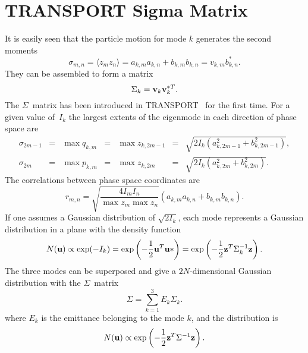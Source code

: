  
\section{TRANSPORT Sigma Matrix}
It is easily seen that the particle motion for mode $k$ generates
the second moments
\begin{equation}
\sigma_{m,n} = \langle z_m z_n\rangle =
a_{k,m} a_{k,n} + b_{k,m} b_{k,n} = v_{k,m} b^*_{k,n}.
\end{equation}
They can be assembled to form a matrix
\begin{equation}
\Sigma_k = \bold{v}_k \bold{v}_k^{*T}.
\end{equation}
The $\Sigma$~matrix has been introduced in TRANSPORT~\cite{SLAC75}
for the first time.
For a given value of~$I_k$ the largest extents
of the eigenmode in each direction of phase space are
\begin{equation}\begin{array}{lllllll}
\sigma_{2m-1} &=& \max q_{k,m} &=& \max z_{k,2m-1} &=&
\sqrt{2 I_k (a_{k,2m-1}^2 + b_{k,2m-1}^2)}, \\
\sigma_{2m} &=& \max p_{k,m} &=& \max z_{k,2m} &=&
\sqrt{2 I_k (a_{k,2m}^2 + b_{k,2m}^2)}.
\end{array}\end{equation}
The correlations between phase space coordinates are
\begin{equation}
r_{m,n} = \sqrt{\frac{4 I_m I_n}{\max z_m \max z_n}}
(a_{k,m} a_{k,n} + b_{k,m} b_{k,n}).
\end{equation}
If one assumes a Gaussian distribution of $\sqrt{2 I_k}$,
each mode represents a Gaussian distribution in a plane
with the density function
\begin{equation}
N(\bold{u}) \propto \exp (-I_k) = \exp \left(
        - \frac{1}{2} \bold{u}^T \bold{u}*
\right) = \exp \left(
        - \frac{1}{2} \bold{z}^T \Sigma_k^{-1} \bold{z}
\right).
\end{equation}
The three modes can be superposed and give a $2N$-dimensional Gaussian
distribution with the $\Sigma$~matrix
\begin{equation}
\Sigma = \sum_{k=1}^3 E_k \Sigma_k.
\end{equation}
where $E_k$ is the emittance belonging to the mode $k$,
and the distribution is
\begin{equation}
N(\bold{u}) \propto \exp \left(
        - \frac{1}{2} \bold{z}^T \Sigma^{-1} \bold{z}
\right).
\end{equation}
 
